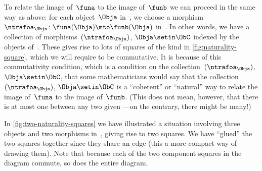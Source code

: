 To relate the image of~$\funa$ to the image of~$\funb$ we can proceed in the same way as above: for each object~$\Obja$ in~\CatC, we choose a morphism~$\ntrafoa_\Obja \colon \funa(\Obja) \mto \funb(\Obja)$ in~\CatD.
In other words, we have a collection of morphisms~$(\ntrafoa_\Obja)$, ${\Obja \setin \ObC}$ indexed by the objects of~\CatC.
These gives rise to lots of squares of the kind in \cref{fig:naturality-square}, which we will require to be commutative.
It is because of this commutativity condition, which is a condition on the collection~$(\ntrafoa_\Obja)$, ${\Obja \setin \ObC}$, that some mathematicians would say that the collection~$(\ntrafoa_\Obja)$, ${\Obja \setin \ObC}$ is a ``coherent'' or ``natural'' way to relate the image of~$\funa$ to the image of~$\funb$.
(This does not mean, however, that there is at most one  between any two given ---on the contrary, there might be many!)

\begin{marginfigure}
    \centering
    \caption{}
    \label{fig:two-naturality-squares}
\end{marginfigure}

In \cref{fig:two-naturality-squares} we have illustrated a situation involving three objects and two morphisms in~\CatC, giving rise to two squares.
We have ``glued'' the two squares together since they share an edge (this a more compact way of drawing them).
Note that because each of the two component squares in the diagram commute, so does the entire diagram.

%
%

\clearpage


